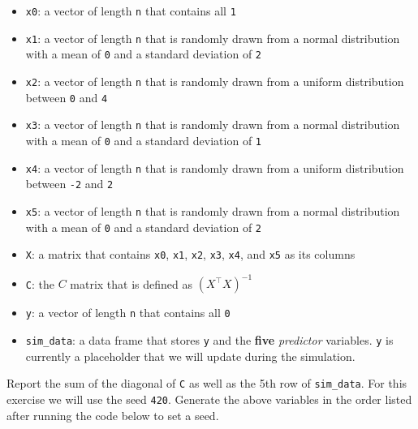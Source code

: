 \documentclass[
]{article}
\providecommand{\tightlist}{%
  \setlength{\itemsep}{0pt}\setlength{\parskip}{0pt}}
\begin{document}
\begin{itemize}
\tightlist
\item
  \texttt{x0}: a vector of length \texttt{n} that contains all
  \texttt{1}
\item
  \texttt{x1}: a vector of length \texttt{n} that is randomly drawn from
  a normal distribution with a mean of \texttt{0} and a standard
  deviation of \texttt{2}
\item
  \texttt{x2}: a vector of length \texttt{n} that is randomly drawn from
  a uniform distribution between \texttt{0} and \texttt{4}
\item
  \texttt{x3}: a vector of length \texttt{n} that is randomly drawn from
  a normal distribution with a mean of \texttt{0} and a standard
  deviation of \texttt{1}
\item
  \texttt{x4}: a vector of length \texttt{n} that is randomly drawn from
  a uniform distribution between \texttt{-2} and \texttt{2}
\item
  \texttt{x5}: a vector of length \texttt{n} that is randomly drawn from
  a normal distribution with a mean of \texttt{0} and a standard
  deviation of \texttt{2}
\item
  \texttt{X}: a matrix that contains \texttt{x0}, \texttt{x1},
  \texttt{x2}, \texttt{x3}, \texttt{x4}, and \texttt{x5} as its columns
\item
  \texttt{C}: the \(C\) matrix that is defined as \((X^\top X)^{-1}\)
\item
  \texttt{y}: a vector of length \texttt{n} that contains all \texttt{0}
\item
  \texttt{sim\_data}: a data frame that stores \texttt{y} and the
  \textbf{five} \emph{predictor} variables. \texttt{y} is currently a
  placeholder that we will update during the simulation.
\end{itemize}

Report the sum of the diagonal of \texttt{C} as well as the 5th row of
\texttt{sim\_data}. For this exercise we will use the seed \texttt{420}.
Generate the above variables in the order listed after running the code
below to set a seed.
\end{document}
